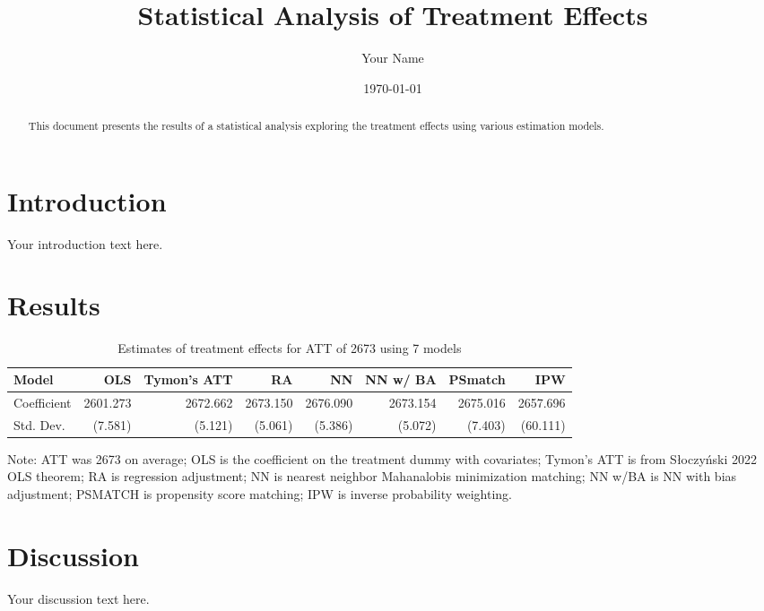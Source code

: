 \documentclass{article}
\title{Statistical Analysis of Treatment Effects}
\author{Your Name}
\date{\today}
\begin{document}
\maketitle

\begin{abstract}
    This document presents the results of a statistical analysis exploring the treatment effects using various estimation models.
\end{abstract}

\section{Introduction}
Your introduction text here.

\section{Results}
\begin{table}[h]
\centering
\caption{Estimates of treatment effects for ATT of 2673 using 7 models}
\label{my-label}
\begin{tabular}{|l|r|r|r|r|r|r|r|}
\hline
Model         & OLS        & Tymon's ATT & RA         & NN         & NN w/ BA   & PSmatch    & IPW        \\ \hline
Coefficient   & 2601.273   & 2672.662    & 2673.150   & 2676.090   & 2673.154   & 2675.016   & 2657.696   \\ 
Std. Dev.     & (7.581)    & (5.121)     & (5.061)    & (5.386)    & (5.072)    & (7.403)    & (60.111)   \\ \hline
\end{tabular}
\footnotesize{Note: ATT was 2673 on average; OLS is the coefficient on the treatment dummy with covariates; Tymon's ATT is from Słoczyński 2022 OLS theorem; RA is regression adjustment; NN is nearest neighbor Mahanalobis minimization matching; NN w/BA is NN with bias adjustment; PSMATCH is propensity score matching; IPW is inverse probability weighting.}
\end{table}

\section{Discussion}
Your discussion text here.
\end{document}
